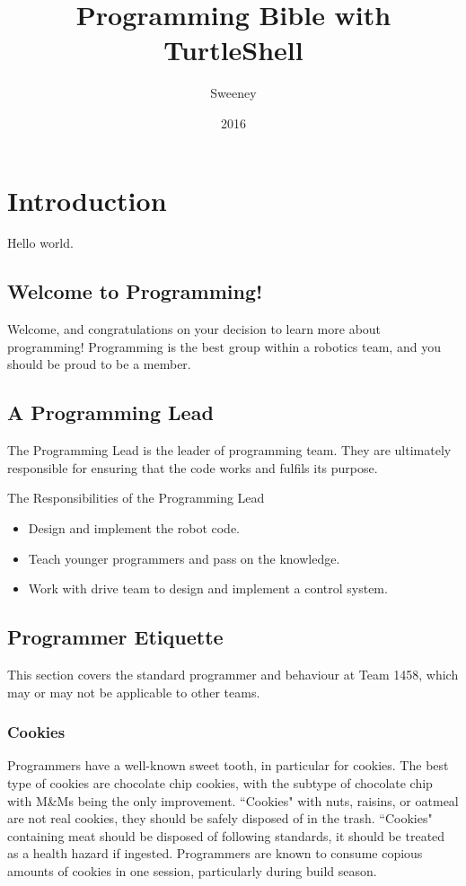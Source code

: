\documentclass[]{report}
\title{Programming Bible with TurtleShell}
\author{Sweeney}
\date{2016}
\begin{document}
\newcommand{\ITwoC}{I$^{2}$C}
\newcommand{\trademark}{$^{TM}$}
\newcommand{\goodcopyright}{$^{\copyright}$}
\newcommand{\pokemon}{Pok\'emon}
\newcommand{\ilc}[1]{\texttt{#1}}%
\maketitle

\tableofcontents

\chapter{Introduction}
Hello world.

\section{Welcome to Programming!}
Welcome, and congratulations on your decision to learn more about programming!
Programming is the best group within a robotics team, and you should be proud to be a member.

\section{A Programming Lead}
The Programming Lead is the leader of programming team.
They are ultimately responsible for ensuring that the code works and fulfils its purpose.

The Responsibilities of the Programming Lead
\begin{itemize}
\item Design and implement the robot code.
\item Teach younger programmers and pass on the knowledge.
\item Work with drive team to design and implement a control system.
\end{itemize}

\section{Programmer Etiquette}
This section covers the standard programmer and behaviour at Team 1458, which may or may not be applicable to other teams.
\subsection{Cookies}
Programmers have a well-known sweet tooth, in particular for cookies.
The best type of cookies are chocolate chip cookies, with the subtype of chocolate chip with M\&Ms being the only improvement.
``Cookies" with nuts, raisins, or oatmeal are not real cookies, they should be safely disposed of in the trash.
``Cookies" containing meat should be disposed of following standards, it should be treated as a health hazard if ingested.
Programmers are known to consume copious amounts of cookies in one session, particularly during build season.
\end{document}
